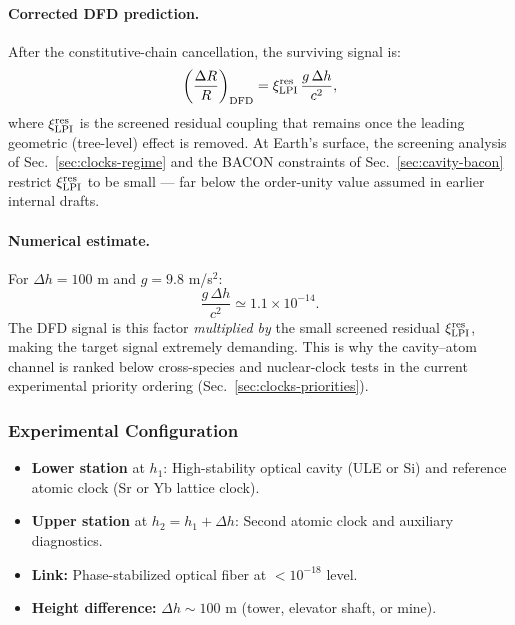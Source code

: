\paragraph{Corrected DFD prediction.}
After the constitutive-chain cancellation, the surviving signal is:
\begin{equation}
\left(\frac{\Delta R}{R}\right)_{\mathrm{DFD}} = \xi_{\rm LPI}^{\rm res}\,\frac{g\,\Delta h}{c^2},
\end{equation}
where $\xi_{\rm LPI}^{\rm res}$ is the screened residual coupling that remains once the leading geometric (tree-level) effect is removed.  At Earth's surface, the screening analysis of Sec.~\ref{sec:clocks-regime} and the BACON constraints of Sec.~\ref{sec:cavity-bacon} restrict $\xi_{\rm LPI}^{\rm res}$ to be small --- far below the order-unity value assumed in earlier internal drafts.

\paragraph{Numerical estimate.}
For $\Delta h = 100$ m and $g = 9.8$ m/s$^2$:
\begin{equation}
\frac{g\,\Delta h}{c^2} \simeq 1.1 \times 10^{-14}.
\end{equation}
The DFD signal is this factor \emph{multiplied by} the small screened residual $\xi_{\rm LPI}^{\rm res}$, making the target signal extremely demanding.  This is why the cavity--atom channel is ranked below cross-species and nuclear-clock tests in the current experimental priority ordering (Sec.~\ref{sec:clocks-priorities}).

\subsubsection{Experimental Configuration}

\begin{itemize}
\item \textbf{Lower station} at $h_1$: High-stability optical cavity (ULE or Si) 
and reference atomic clock (Sr or Yb lattice clock).
\item \textbf{Upper station} at $h_2 = h_1 + \Delta h$: Second atomic clock 
and auxiliary diagnostics.
\item \textbf{Link:} Phase-stabilized optical fiber at $< 10^{-18}$ level.
\item \textbf{Height difference:} $\Delta h \sim 100$ m (tower, elevator shaft, or mine).
\end{itemize}

